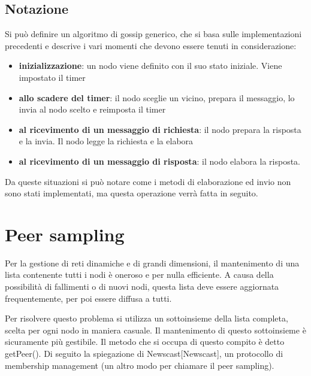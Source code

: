 \subsection{Notazione}

Si può definire un algoritmo di gossip generico, che si basa sulle implementazioni precedenti e descrive i vari momenti che devono essere tenuti in considerazione:
\begin{itemize}
    \item \textbf{inizializzazione}: un nodo viene definito con il suo stato iniziale. Viene impostato il timer
    \item \textbf{allo scadere del timer}: il nodo sceglie un vicino, prepara il messaggio, lo invia al nodo scelto e reimposta il timer
    \item \textbf{al ricevimento di un messaggio di richiesta}: il nodo prepara la risposta e la invia. Il nodo legge la richiesta e la elabora
    \item \textbf{al ricevimento di un messaggio di risposta}: il nodo elabora la risposta.
\end{itemize}

Da queste situazioni si può notare come i metodi di elaborazione ed invio non sono stati implementati, ma questa operazione verrà fatta in seguito. 

\section{Peer sampling}

Per la gestione di reti dinamiche e di grandi dimensioni, il mantenimento di una lista contenente tutti i nodi è oneroso e per nulla efficiente. A causa della possibilità di fallimenti o di nuovi nodi, questa lista deve essere aggiornata frequentemente, per poi essere diffusa a tutti. 

Per risolvere questo problema si utilizza un sottoinsieme della lista completa, scelta per ogni nodo in maniera casuale. Il mantenimento di questo sottoinsieme è sicuramente più gestibile. 
Il metodo che si occupa di questo compito è detto getPeer().
Di seguito la spiegazione di Newscast[Newscast], un protocollo di membership management (un altro modo per chiamare il peer sampling).


